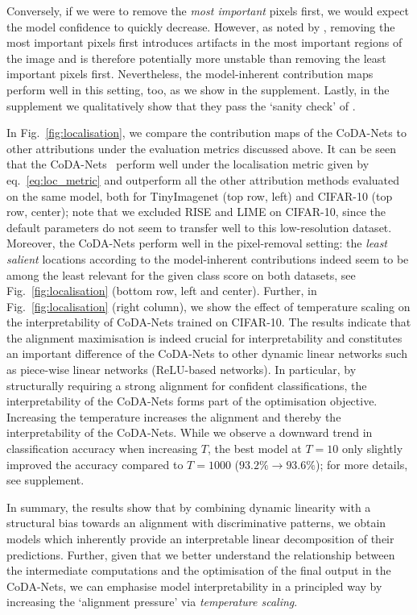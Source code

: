 Conversely, if we were to remove the \emph{most important} pixels first, we would expect the model confidence to quickly decrease. However, as noted by \cite{srinivas2019full}, removing the most important pixels first introduces artifacts in the most important regions of the image and is therefore potentially more unstable than removing the least important pixels first.
Nevertheless, the model-inherent contribution maps perform well in this setting, too, as we show in the supplement.
Lastly, in the supplement we qualitatively show that they pass the `sanity check' of \cite{adebayo2018sanity}.

In Fig.~\ref{fig:localisation}, we compare the contribution maps of the CoDA-Nets to other attributions under the evaluation metrics discussed above.
It can be seen that the CoDA-Nets~
    perform well under the localisation metric given by eq.~\eqref{eq:loc_metric} and outperform all 
    the other attribution methods evaluated on the same model, both for TinyImagenet (top row, left) and CIFAR-10 (top row, center); note that we excluded RISE and LIME on CIFAR-10, since the default parameters do not seem to transfer well to this low-resolution dataset. 
Moreover,  
    the CoDA-Nets perform well in the pixel-removal setting: 
    the \emph{least salient} locations according to the model-inherent contributions indeed seem to be among the least relevant for the given class score on both datasets, see Fig.~\ref{fig:localisation} (bottom row, left and center). 
Further, in Fig.~\ref{fig:localisation} (right column),  we show the effect of temperature scaling on the interpretability of CoDA-Nets trained on CIFAR-10. The results indicate that the alignment maximisation is indeed crucial for interpretability and constitutes an important difference of the CoDA-Nets to other dynamic linear networks such as piece-wise linear networks (ReLU-based networks). In particular, by structurally requiring a strong alignment for confident classifications, the interpretability of the CoDA-Nets forms part of the optimisation objective.
Increasing the temperature increases the alignment and thereby the interpretability of the CoDA-Nets. While we observe a downward trend in classification accuracy when increasing $T$, the best model at $T=10$ only slightly improved the accuracy compared to $T=1000$ ($93.2\%\rightarrow 93.6\%$); for more details, see supplement.

In summary, the results show that by combining dynamic linearity with a structural bias towards an alignment with discriminative patterns, we obtain models which inherently provide an interpretable linear decomposition of their predictions. 
Further, given that we better understand the relationship between the intermediate computations and the optimisation of the final output in the CoDA-Nets, we can emphasise model interpretability in a principled way by increasing the `alignment pressure' via \emph{temperature scaling}.
    
